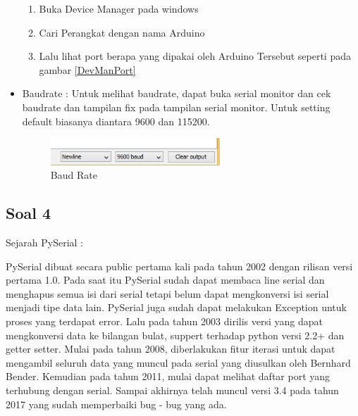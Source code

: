 \begin{itemize}
\begin{enumerate}
			\item Buka Device Manager pada windows
			\item Cari Perangkat dengan nama Arduino
			\item Lalu lihat port berapa yang dipakai oleh Arduino Tersebut seperti pada gambar \ref{DevManPort}
		\end{enumerate}		
	\item Baudrate : Untuk melihat baudrate, dapat buka serial monitor dan cek baudrate dan tampilan fix pada tampilan serial monitor. Untuk setting default biasanya diantara 9600 dan 115200.
	\begin{figure} [ht]
			\centerline{\includegraphics[width=0.6\textwidth]{figures/5/1174035/Teori/Baudrate.png}}
			\caption{Baud Rate}
			\label{BaudRate}
		\end{figure}
\end{itemize}

\subsection{Soal 4}
Sejarah PySerial : 

PySerial dibuat secara public pertama kali pada tahun 2002 dengan rilisan versi pertama 1.0. Pada saat itu PySerial sudah dapat membaca line serial dan menghapus semua isi dari serial tetapi belum dapat mengkonversi isi serial menjadi tipe data lain. PySerial juga sudah dapat melakukan Exception untuk proses yang terdapat error. Lalu pada tahun 2003 dirilis versi yang dapat mengkonversi data ke bilangan bulat, suppert terhadap python versi 2.2+ dan getter setter. Mulai pada tahun 2008, diberlakukan fitur iterasi untuk dapat mengambil seluruh data yang muncul pada serial yang diusulkan oleh Bernhard Bender. Kemudian pada tahun 2011, mulai dapat melihat daftar port yang terhubung dengan serial. Sampai akhirnya telah muncul versi 3.4 pada tahun 2017 yang sudah memperbaiki bug - bug yang ada.

